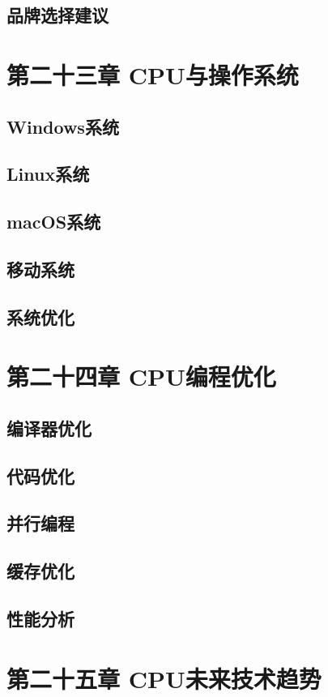 \documentclass[12pt,UTF8]{ctexbook}
\begin{document}
\section{品牌选择建议}

\chapter{第二十三章 CPU与操作系统}

\section{Windows系统}
\section{Linux系统}
\section{macOS系统}
\section{移动系统}
\section{系统优化}

\chapter{第二十四章 CPU编程优化}

\section{编译器优化}
\section{代码优化}
\section{并行编程}
\section{缓存优化}
\section{性能分析}

\chapter{第二十五章 CPU未来技术趋势}
\end{document}
